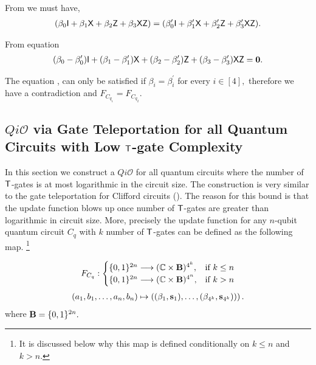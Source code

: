 From  we must have,
\begin{equation}
\label{lemma:1qubit:eq4}
\begin{aligned}
(\beta_0 {\sf I}+\beta_1 {\sf X}+\beta_2 {\sf Z}+\beta_3 {\sf X} {\sf Z}) =(\beta_0^\prime {\sf I}+\beta_1^\prime {\sf X}+\beta_2^\prime {\sf Z}+\beta_3^\prime {\sf X} {\sf Z}).\\
\end{aligned}
\end{equation}

From equation 
\begin{equation}
\label{lemma:1qubit:eq5}
\begin{aligned}
(\beta_0-\beta_0^\prime) {\sf I}+(\beta_1 -\beta_1^\prime){\sf X}+(\beta_2-\beta_2^\prime) {\sf Z}+(\beta_3-\beta^\prime_3) {\sf X} {\sf Z}={\bf 0}.
\end{aligned}
\end{equation}

The equation ,  can only be satisfied if $\beta_i = \beta_i^\prime$ for every $i\in[4],$ therefore we have a contradiction and $F_{C_{q_1}}=F_{C_{q_2}}.$



\subsection{$Qi\mathcal{O}$ via Gate Teleportation for all Quantum Circuits with Low ${\sf T}$-gate Complexity }
\label{sec:n-qubit-circuits}
In this section we construct a $Qi\mathcal{O}$ for all quantum circuits where the number of ${\sf T}$-gates is at most logarithmic in the circuit size. The construction is very similar to the gate teleportation for Clifford circuits (). The reason for this bound is that the update function blows up once number of ${\sf T}$-gates are greater than logarithmic in circuit size. More, precisely the update function for any $n$-qubit quantum circuit $C_q$ with $k$ number of ${\sf T}$-gates can be defined as the following map. \footnote{It is discussed below why this map is defined conditionally on $k\leq n$ and $k>n$.}

\begin{equation}
\label{nqubit:eq0}
\begin{aligned}
 F_{C_q}:
\begin{cases}
    \{0,1\}^{2n}\longrightarrow  (\mathbb{C} \times {\bf B})^{4^k},& \text{if } k\leq n\\
     \{0,1\}^{2n}\longrightarrow  (\mathbb{C} \times {\bf B})^{4^n}, & \text{if } k> n\\
\end{cases}
\end{aligned}
\end{equation}
\begin{equation}
\begin{aligned}
 (a_1,b_1,\ldots, a_n,b_n) \mapsto \left((\beta_1, {\bf s}_1),\dots, (\beta_{4^k}, {\bf s}_{4^k}))\right).
\end{aligned}
\end{equation}      
where  ${\bf B}=\{0,1\}^{2n}.$ 

